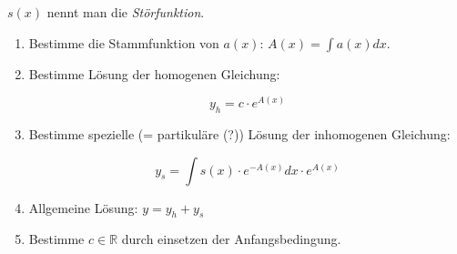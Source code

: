 \documentclass[a4paper, 16pt]{article}
\begin{document}
	$s(x)$ nennt man die \emph{Störfunktion}.

	\begin{enumerate}
		\item Bestimme die Stammfunktion von $a(x)$: $A(x) = \int a(x) dx$.

		\item Bestimme Lösung der homogenen Gleichung:

		\begin{equation*}
			y_h = c \cdot e^{A(x)}
		\end{equation*}

		\item Bestimme spezielle (= partikuläre (?)) Lösung der inhomogenen Gleichung:

		\begin{equation*}
			y_s = \int s(x) \cdot e^{-A(x)} dx \cdot e^{A(x)}
		\end{equation*}

		\item Allgemeine Lösung: $y = y_h + y_s$

		\item Bestimme $c \in \mathbb{R}$ durch einsetzen der Anfangsbedingung.
	\end{enumerate}
\end{document}

